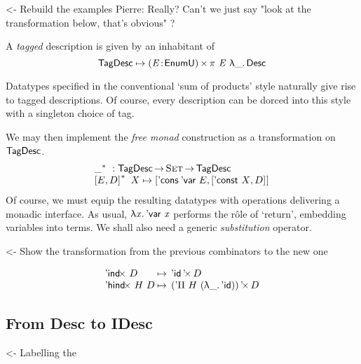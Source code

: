 \documentclass[preprint, authoryear, onecolumn]{sigplanconf}
\newenvironment{structure}{\footnotesize\verbatim}{\endverbatim}
\begin{document}
\begin{structure}
<- Rebuild the examples
Pierre: Really? Can't we just say "look at the transformation below, that's obvious" ?
\end{structure}

A \emph{tagged} description is given by an inhabitant of
\[
 \F{TagDesc} \mapsto \SIGMA{\V{E}}{\EnumU}\spi{\V{E}}{\LAM{\_}\Desc}
\]


Datatypes specified in the conventional `sum of products' style naturally give rise to tagged descriptions. Of course, every description can be dorced into this style with a singleton choice of tag.

We may then implement the \emph{free monad} construction as a
transformation on \(\F{TagDesc}\).
\[\stk{
\FreeMonad{\_} : \F{TagDesc} \To \Set \To \F{TagDesc} \\
\FreeMonad{\pair{E}{D}{}}\:X \mapsto
\pair{\ListCons{\:\DVar{}}{E}}{\pair{\DConst{X}}{D}{}}{}
}\]
Of course, we must equip the resulting datatypes with operations delivering a monadic interface. As usual, \(\LAM{\x}\DVar{\x}\) performs the r\^ole of `return', embedding variables into terms. We shall also need a generic \emph{substitution} operator.

\begin{structure}
<- Show the transformation from the previous combinators to the new one
\end{structure}

\[\begin{array}{l@{\:\mapsto\:\:}l}
\DIndx{D}         & \DProd{\DId}{D}                      \\
\DHindx{H}{D}     & \DProd{(\DPi{H}{(\LAM{\_} \DId)})}{D}
\end{array}
\]


\subsection{From Desc to IDesc}

\begin{structure}
<- Labelling the \DId
\end{structure}

\end{document}

